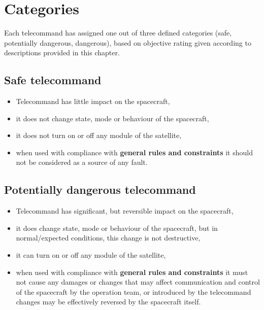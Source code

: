 \section{Categories}

Each telecommand has assigned one out of three defined categories (safe, potentially dangerous, dangerous), based on objective rating given according to descriptions provided in this chapter.

\subsection{Safe telecommand}
\vspace{1em}
\begin{itemize}
    \item Telecommand has little impact on the spacecraft,
    \item it does not change state, mode or behaviour of the spacecraft,
    \item it does not turn on or off any module of the satellite,
    \item when used with compliance with \textbf{general rules and constraints} it should not be considered as a source of any fault.
\end{itemize}

\subsection{Potentially dangerous telecommand}
\vspace{1em}
\begin{itemize}
    \item Telecommand has significant, but reversible impact on the spacecraft,
    \item it does change state, mode or behaviour of the spacecraft, but in normal/expected conditions, this change is not destructive,
    \item it can turn on or off any module of the satellite,
    \item when used with compliance with \textbf{general rules and constraints} it must not cause any damages or changes that may affect communication and control of the spacecraft by the operation team, or introduced by the telecommand changes may be effectively reversed by the spacecraft itself.
\end{itemize}


